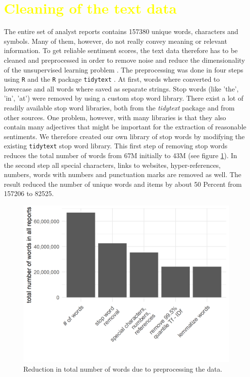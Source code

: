 \section{\textcolor{yellow}{Cleaning of the text data}}\label{cleaningText}
The entire set of analyst reports contains 157380 unique words, characters and symbols. Many of them, however, do not really convey meaning or relevant information. To get reliable sentiment scores, the text data therefore has to be cleaned and preprocessed in order to remove noise and reduce the dimensionality of the unsupervised learning problem \citep{HADDI201326}. The preprocessing was done in four steps using \texttt{R} \citep{Rproject} and the \texttt{R} package \texttt{tidytext} \citep{tidytext}. At first, words where converted to lowercase and all words where saved as separate strings. Stop words (like 'the', 'in', 'at') were removed by using a custom stop word library. There exist a lot of readily available stop word libraries, both from the \textit{tidytext} package and from other sources. One problem, however, with many libraries is that they also contain many adjectives that might be important for the extraction of reasonable sentiments. We therefore created our own library of stop words by modifying the existing \texttt{tidytext} stop word library. This first step of removing stop words reduces the total number of words from 67M initially to 43M (see figure \ref{fig:TotWord}). In the second step all special characters, links to websites, hyper-references, numbers, words with numbers and punctuation marks are removed as well. The result reduced the number of unique words and items by about 50 Percent from 157206 to 82525.  \\

\begin{figure}[h]
\centering
\includegraphics[width=\textwidth]{figures/ReductionInTotalNWords.png}
\caption{Reduction in total number of words due to preprocessing the data.}
\label{fig:TotWord}
\end{figure}

